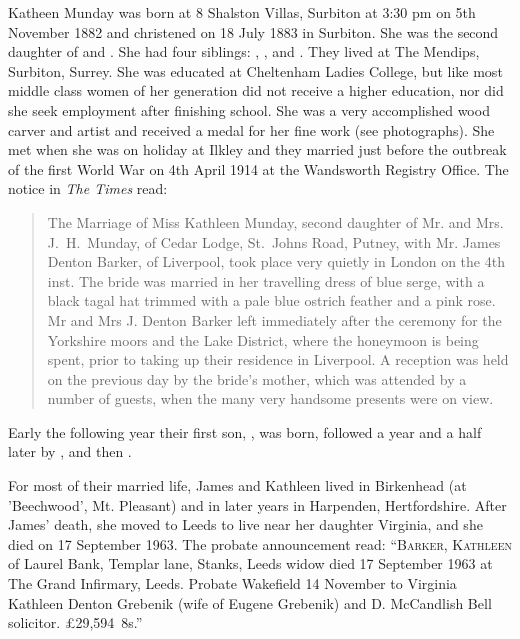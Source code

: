 
Katheen Munday was born at 8 Shalston Villas, Surbiton at 3:30 pm on 5th November 1882\cite{JHMtree, KMbirthCert, JHMbible} and christened on 18 July 1883 in Surbiton. She was the second daughter of  and . She had four siblings: , ,  and .
They lived at The Mendips, Surbiton, Surrey.  She was educated at Cheltenham Ladies College, but like most middle class women of her generation did not receive a higher education, nor did she seek employment after finishing school. She was a very accomplished wood carver and artist and received a medal for her fine work (see photographs). She met  when she was on holiday at Ilkley and they married just before the outbreak of the first World War on 4th April 1914 at the Wandsworth Registry Office.\cite{KathleenJamesWeddingIndex} The notice in \emph{The Times} read:

\begin{quotation}
The Marriage of Miss Kathleen Munday, second daughter of Mr. and Mrs. J.\ H.\ Munday, of Cedar Lodge, St.\ Johns Road, Putney, with Mr. James Denton Barker, of Liverpool, took place very quietly in London on the 4th inst. The bride was married in her travelling dress of blue serge, with a black tagal hat trimmed with a pale blue ostrich feather and a pink rose. Mr and Mrs J. Denton Barker left immediately after the ceremony for the Yorkshire moors and the Lake District, where the honeymoon is being spent, prior to taking up their residence in Liverpool. A reception was held on the previous day by the bride's mother, which was attended by a number of guests, when the many very handsome presents were on view.
\end{quotation}

Early the following year their first son, , was born,
followed a year and a half later by ,
and then .

For most of their married life, James and Kathleen lived in Birkenhead (at 'Beechwood', Mt. Pleasant) and in later years in Harpenden, Hertfordshire. After James' death, she moved to Leeds to live near her daughter Virginia, and she died on 17 September 1963. The probate announcement read: ``\textsc{Barker, Kathleen} of Laurel Bank, Templar lane, Stanks, Leeds widow died 17 September 1963 at The Grand Infirmary, Leeds. Probate Wakefield 14 November to Virginia Kathleen Denton Grebenik (wife of Eugene Grebenik) and D. McCandlish Bell solicitor. \pounds29,594~8s.''

